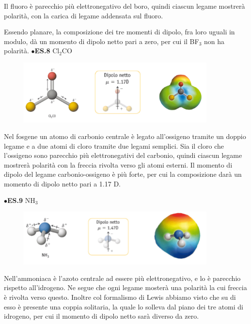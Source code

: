 Il fluoro è parecchio più elettronegativo del boro, quindi ciascun legame mostrerà polarità, con la carica di legame addensata sul fluoro.

Essendo planare, la composizione dei tre momenti di dipolo, fra loro uguali in modulo, dà un momento di dipolo netto pari a zero, per cui il BF$_3$ non ha polarità. 
\newpage
\vspace{0.2cm}$\bullet$\textbf{ES.8} Cl$_2$CO

\vspace{-0.3cm}\begin{figure}[htp]
    \centering
    \includegraphics[width=10cm]{immagini/Cl_2CO.png}
\end{figure}

\vspace{-0.3cm}Nel fosgene un atomo di carbonio centrale è legato all'ossigeno tramite un doppio legame e a due atomi di cloro tramite due legami semplici. Sia il cloro che l'ossigeno sono parecchio più elettronegativi del carbonio, quindi ciascun legame mostrerà polarità con la freccia rivolta verso gli atomi esterni. Il momento di dipolo del legame carbonio-ossigeno è più forte, per cui la composizione darà un momento di dipolo netto pari a 1.17 D.

\vspace{0.2cm}$\bullet$\textbf{ES.9} NH$_3$

\vspace{-0.3cm}\begin{figure}[htp]
    \centering
    \includegraphics[width=10cm]{immagini/NH_3.png}
\end{figure}

\vspace{-0.3cm}Nell'ammoniaca è l'azoto centrale ad essere più elettronegativo, e lo è parecchio rispetto all'idrogeno. Ne segue che ogni legame mosterà una polarità la cui freccia è rivolta verso questo. Inoltre col formalismo di Lewis abbiamo visto che su di esso è presente una coppia solitaria, la quale lo solleva dal piano dei tre atomi di idrogeno, per cui il momento di dipolo netto sarà diverso da zero.

